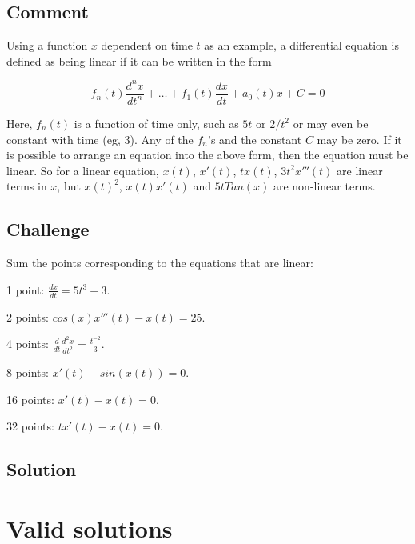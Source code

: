 \subsection*{Comment}
Using a function $x$ dependent on time $t$ as an example, a differential equation is defined as being linear if it can be written in the form

\begin{equation}
    f_n(t) \frac{d^nx}{d t^n} + \dots + f_1(t) \frac{dx}{dt} + a_0(t) x + C = 0
\end{equation}

Here, $f_n(t)$ is a function of time only, such as $5t$ or $2/t^2$ or may even be constant with time (eg, $3$).
Any of the $f_n$'s and the constant $C$ may be zero.
If it is possible to arrange an equation into the above form, then the equation must be linear.
So for a linear equation, $x(t)$, $x'(t)$, $t x(t)$, $3t^2 x'''(t)$ are linear terms in $x$, but $x(t)^2$, $x(t) x'(t)$ and $5 t Tan(x)$ are non-linear terms.

\subsection*{Challenge}
Sum the points corresponding to the equations that are linear:

1 point: $\displaystyle \frac{dx}{dt} = 5t^3 + 3$.

2 points: $\displaystyle cos(x) x'''(t) - x(t) = 25$.

4 points: $\displaystyle \frac{d}{dt} \frac{d^2 x}{dt^2} = \frac{t^{-2}}{3}$.

8 points: $\displaystyle x'(t) - sin(x(t)) = 0$.

16 points: $\displaystyle x'(t) - x(t) = 0$.

32 points: $\displaystyle t x'(t) - x(t) = 0$.

\subsection*{Solution}
\six{}


\timebox


\newpage

\section{Valid solutions}

